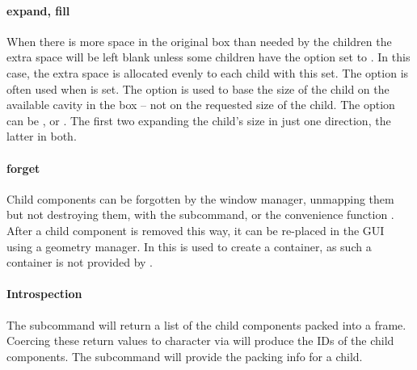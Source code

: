 \paragraph{expand, fill}
When there is more space in the original box than needed by the
children the extra space will be left blank unless some children have
the option  set to . In this case,
the extra space is allocated evenly to each child with this set. The
 option is often used when  is set.  The
 option is used to base the size of the child on
the available cavity in the box -- not on the requested size of the
child. The  option can be ,  or
. The first two expanding the child's size in just one
direction, the latter in both.

\paragraph{forget}
Child components can be forgotten by the window manager, unmapping them but not destroying them, with the  subcommand, or the convenience function . After a child component is removed this way, it can be re-placed in the GUI using a geometry manager. In  this is used to create a  container, as such a container is not provided by \TK.

\paragraph{Introspection}
The subcommand  will return a list of the
child components packed into a frame. Coercing these return values to
character via  will produce the IDs of the child
components. The subcommand  will provide the
packing info for a child.

